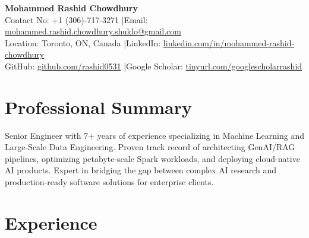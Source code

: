 \documentclass[10pt,letterpaper]{article}
\begin{document}
\begin{center}
    {\Huge \bfseries \color{primary} Mohammed Rashid Chowdhury} \\[4pt]
    \small
    Contact No: +1 (306)-717-3271 \quad|\quad Email: \href{mailto:mohammed.rashid.chowdhury.shuklo@gmail.com}{mohammed.rashid.chowdhury.shuklo@gmail.com} \\
    Location: Toronto, ON, Canada \quad|\quad LinkedIn: \href{https://www.linkedin.com/in/mohammed-rashid-chowdhury}{linkedin.com/in/mohammed-rashid-chowdhury} \\
    GitHub: \href{https://github.com/rashid0531}{github.com/rashid0531} \quad|\quad Google Scholar: \href{http://tinyurl.com/googlescholarrashid}{tinyurl.com/googlescholarrashid}
\end{center}

\vspace{-4pt}

\section{Professional Summary}
Senior Engineer with 7+ years of experience specializing in Machine Learning and Large-Scale Data Engineering. Proven track record of architecting GenAI/RAG pipelines, optimizing petabyte-scale Spark workloads, and deploying cloud-native AI products. Expert in bridging the gap between complex AI research and production-ready software solutions for enterprise clients.

\section{Experience}
\end{document}
